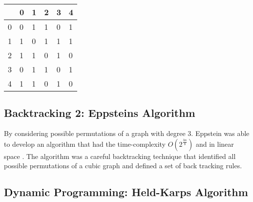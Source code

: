 \begin{table}[H]
    \centering
    \begin{tabular}{l | lllll}
          & 0 & 1 & 2 & 3 & 4  \\
        \hline
        0 & 0 & 1 & 1 & 0 & 1  \\
        1 & 1 & 0 & 1 & 1 & 1  \\
        2 & 1 & 1 & 0 & 1 & 0  \\
        3 & 0 & {\cellcolor[rgb]{0.933,0.804,0.804}}1 & 1 & 0 & 1  \\
        4 & 1 & 1 & 0 & 1 & 0 
    \end{tabular}
\end{table}


\subsection{Backtracking 2: Eppsteins Algorithm}

By considering possible permutations of a graph with degree 3. Eppstein was able
to develop an algorithm that had the time-complexity $O(2^{\frac{3n}{8}})$ and
in linear space \cite{Epps2007}. The algorithm was a careful backtracking
technique that identified all possible permutations of a cubic graph and defined
a set of back tracking rules.

\subsection{Dynamic Programming: Held-Karps Algorithm}

